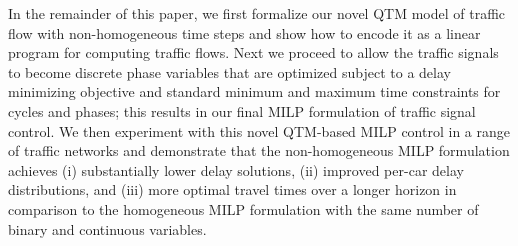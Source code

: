 In the remainder of this paper, we first formalize our
novel QTM model of traffic flow with non-homogeneous time steps and
show how to encode it as a linear program for computing traffic flows.
%
Next we proceed to allow the traffic signals to become discrete phase
variables that are optimized subject to a delay minimizing objective
and standard minimum and maximum time constraints for cycles and
phases; this results in our final MILP formulation of traffic signal
control.
%
We then experiment with this novel QTM-based MILP control in a range
of traffic networks and demonstrate that the non-homogeneous MILP
formulation achieves (i) substantially lower delay solutions, (ii)
improved per-car delay distributions, and (iii) more optimal travel
times over a longer horizon in comparison to the homogeneous MILP
formulation with the same number of binary and continuous variables.

%
%
%


